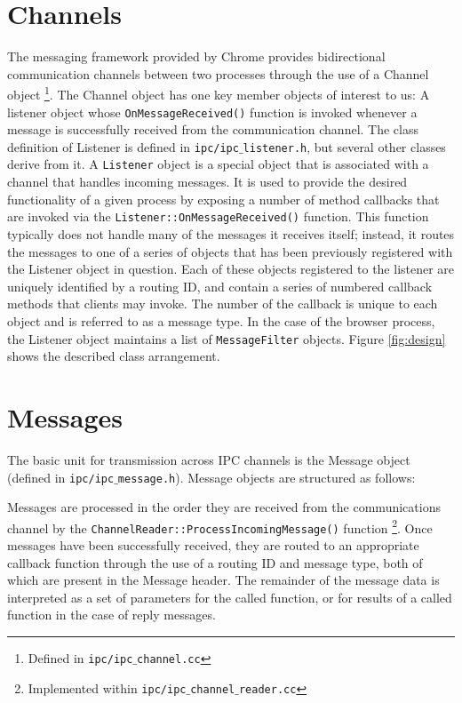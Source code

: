 \section{Channels}
The messaging framework provided by Chrome provides bidirectional communication channels between two processes through the use of a Channel object \footnote{Defined in \texttt{ipc/ipc$\_$channel.cc}}. The Channel object has one key member objects of interest to us: A listener object whose \texttt{OnMessageReceived()} function is invoked whenever a message is successfully received from the communication channel. The class definition of Listener is defined in \texttt{ipc/ipc$\_$listener.h}, but several other classes derive from it. A \texttt{Listener} object is a special object that is associated with a channel that handles incoming messages. It is used to provide the desired functionality of a given process by exposing a number of method callbacks that are invoked via the \texttt{Listener::OnMessageReceived()} function. This function typically does not handle many of the messages it receives itself; instead, it routes the messages to one of a series of objects that has been previously registered with the Listener object in question. Each of these objects registered to the listener are uniquely identified by a routing ID, and contain a series of numbered callback methods that clients may invoke. The number of the callback is unique to each object and is referred to as a message type. In the case of the browser process, the Listener object maintains a list of \texttt{MessageFilter} objects. Figure \ref{fig:design} shows the described class arrangement.


\section{Messages}

The basic unit for transmission across IPC channels is the Message object (defined in \texttt{ipc/ipc$\_$message.h}). Message objects are structured as follows:

Messages are processed in the order they are received from the communications channel by the \texttt{ChannelReader::ProcessIncomingMessage()} function \footnote{Implemented within \texttt{ipc/ipc$\_$channel$\_$reader.cc}}. Once messages have been successfully received, they are routed to an appropriate callback function through the use of a routing ID and message type, both of which are present in the Message header. The remainder of the message data is interpreted as a set of parameters for the called function, or for results of a called function in the case of reply messages.

